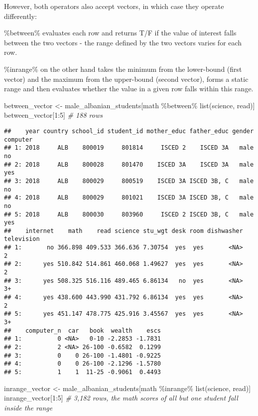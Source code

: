 \documentclass[
]{article}
\newenvironment{Shaded}{\begin{snugshade}}{\end{snugshade}}
\newcommand{\CommentTok}[1]{\textcolor[rgb]{0.56,0.35,0.01}{\textit{#1}}}
\newcommand{\DecValTok}[1]{\textcolor[rgb]{0.00,0.00,0.81}{#1}}
\newcommand{\FunctionTok}[1]{\textcolor[rgb]{0.00,0.00,0.00}{#1}}
\newcommand{\NormalTok}[1]{#1}
\newcommand{\OtherTok}[1]{\textcolor[rgb]{0.56,0.35,0.01}{#1}}
\newcommand{\SpecialCharTok}[1]{\textcolor[rgb]{0.00,0.00,0.00}{#1}}
\begin{document}
However, both operators also accept vectors, in which case they operate
differently:

\%between\% evaluates each row and returns T/F if the value of interest
falls between the two vectors - the range defined by the two vectors
varies for each row.

\%inrange\% on the other hand takes the minimum from the lower-bound
(first vector) and the maximum from the upper-bound (second vector),
forms a static range and then evaluates whether the value in a given row
falls within this range.

\begin{Shaded}
\begin{Highlighting}[]
\NormalTok{between\_vector }\OtherTok{\textless{}{-}}\NormalTok{ male\_albanian\_students[math }\SpecialCharTok{\%between\%} \FunctionTok{list}\NormalTok{(science, read)]}
\NormalTok{between\_vector[}\DecValTok{1}\SpecialCharTok{:}\DecValTok{5}\NormalTok{] }\CommentTok{\# 188 rows}
\end{Highlighting}
\end{Shaded}

\begin{verbatim}
##    year country school_id student_id mother_educ father_educ gender computer
## 1: 2018     ALB    800019     801814     ISCED 2    ISCED 3A   male       no
## 2: 2018     ALB    800028     801470    ISCED 3A    ISCED 3A   male      yes
## 3: 2018     ALB    800029     800519    ISCED 3A ISCED 3B, C   male       no
## 4: 2018     ALB    800029     801021    ISCED 3A ISCED 3B, C   male       no
## 5: 2018     ALB    800030     803960     ISCED 2 ISCED 3B, C   male      yes
##    internet    math    read science stu_wgt desk room dishwasher television
## 1:       no 366.898 409.533 366.636 7.30754  yes  yes       <NA>          2
## 2:      yes 510.842 514.861 460.068 1.49627  yes  yes       <NA>          2
## 3:      yes 508.325 516.116 489.465 6.86134   no  yes       <NA>         3+
## 4:      yes 438.600 443.990 431.792 6.86134  yes  yes       <NA>          2
## 5:      yes 451.147 478.775 425.916 3.45567  yes  yes       <NA>         3+
##    computer_n  car   book  wealth    escs
## 1:          0 <NA>   0-10 -2.2853 -1.7831
## 2:          2 <NA> 26-100 -0.6582  0.1299
## 3:          0    0 26-100 -1.4801 -0.9225
## 4:          0    0 26-100 -2.1296 -1.5780
## 5:          1    1  11-25 -0.9061  0.4493
\end{verbatim}

\begin{Shaded}
\begin{Highlighting}[]
\NormalTok{inrange\_vector }\OtherTok{\textless{}{-}}\NormalTok{ male\_albanian\_students[math }\SpecialCharTok{\%inrange\%} \FunctionTok{list}\NormalTok{(science, read)]}
\NormalTok{inrange\_vector[}\DecValTok{1}\SpecialCharTok{:}\DecValTok{5}\NormalTok{] }\CommentTok{\# 3,182 rows, the math scores of all but one student fall inside the range}
\end{Highlighting}
\end{Shaded}
\end{document}
